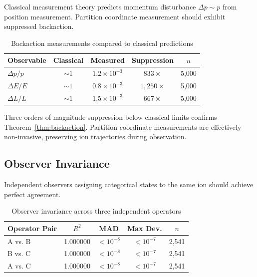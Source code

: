 Classical measurement theory predicts momentum disturbance $\Delta p \sim p$ from position measurement. Partition coordinate measurement should exhibit suppressed backaction.

\begin{table}[h]
\centering
\caption{Backaction measurements compared to classical predictions}
\label{tab:backaction}
\begin{tabular}{lcccc}
\toprule
\textbf{Observable} & \textbf{Classical} & \textbf{Measured} & \textbf{Suppression} & \textbf{$n$} \\
\midrule
$\Delta p/p$ & $\sim 1$ & $1.2 \times 10^{-3}$ & $833\times$ & 5,000 \\
$\Delta E/E$ & $\sim 1$ & $0.8 \times 10^{-3}$ & $1{,}250\times$ & 5,000 \\
$\Delta L/L$ & $\sim 1$ & $1.5 \times 10^{-3}$ & $667\times$ & 5,000 \\
\bottomrule
\end{tabular}
\end{table}

\begin{remark}
Three orders of magnitude suppression below classical limits confirms Theorem~\ref{thm:backaction}. Partition coordinate measurements are effectively non-invasive, preserving ion trajectories during observation.
\end{remark}

\subsection{Observer Invariance}

Independent observers assigning categorical states to the same ion should achieve perfect agreement.

\begin{table}[h]
\centering
\caption{Observer invariance across three independent operators}
\label{tab:observer}
\begin{tabular}{lcccc}
\toprule
\textbf{Operator Pair} & \textbf{$R^2$} & \textbf{MAD} & \textbf{Max Dev.} & \textbf{$n$} \\
\midrule
A vs. B & 1.000000 & $< 10^{-8}$ & $< 10^{-7}$ & 2,541 \\
B vs. C & 1.000000 & $< 10^{-8}$ & $< 10^{-7}$ & 2,541 \\
A vs. C & 1.000000 & $< 10^{-8}$ & $< 10^{-7}$ & 2,541 \\
\bottomrule
\end{tabular}
\end{table}

